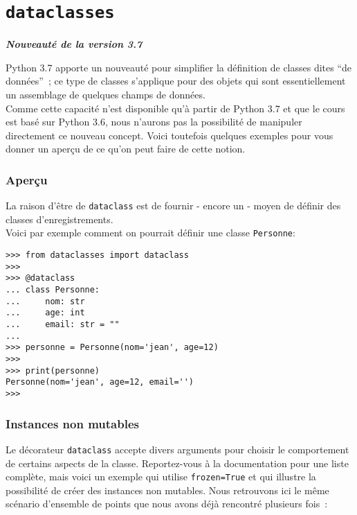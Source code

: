     \hypertarget{dataclasses}{%
\section{\texorpdfstring{\texttt{dataclasses}}{dataclasses}}\label{dataclasses}}

\textbf{\emph{Nouveauté de la version 3.7}}

Python 3.7 apporte un nouveauté pour simplifier la définition de classes
dites ``de données''~; ce type de classes s'applique pour des objets qui
sont essentiellement un assemblage de quelques champs de données.\\

    Comme cette capacité n'est disponible qu'à partir de Python 3.7 et que
le cours est basé sur Python 3.6, nous n'aurons pas la possibilité de
manipuler directement ce nouveau concept. Voici toutefois quelques
exemples pour vous donner un aperçu de ce qu'on peut faire de cette
notion.

    \hypertarget{aperuxe7u}{%
\subsubsection{Aperçu}\label{aperuxe7u}}

    La raison d'être de \texttt{dataclass} est de fournir - encore un -
moyen de définir des classes d'enregistrements.\\

Voici par exemple comment on pourrait définir une classe
\texttt{Personne}:

    \begin{verbatim}
>>> from dataclasses import dataclass
>>>
>>> @dataclass
... class Personne:
...     nom: str
...     age: int
...     email: str = ""
...
>>> personne = Personne(nom='jean', age=12)
>>>
>>> print(personne)
Personne(nom='jean', age=12, email='')
>>>
\end{verbatim}

    \hypertarget{instances-non-mutables}{%
\subsubsection{Instances non mutables}\label{instances-non-mutables}}

    Le décorateur \texttt{dataclass} accepte divers arguments pour choisir
le comportement de certains aspects de la classe. Reportez-vous à la
documentation pour une liste complète, mais voici un exemple qui utilise
\texttt{frozen=True} et qui illustre la possibilité de créer des
instances non mutables. Nous retrouvons ici le même scénario d'ensemble
de points que nous avons déjà rencontré plusieurs fois~:


